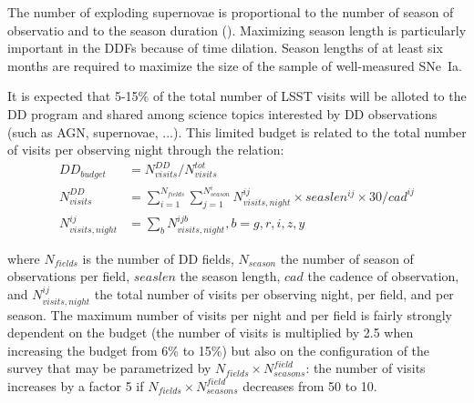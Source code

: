 \documentclass[skiphelvet,twocolumn]{aastex63}
\newcommand{\sne}{{SNe~Ia}}
\begin{document}
\par
The number of exploding supernovae is proportional to the number of season of observatio and to the season duration (\citealt{perrett}). Maximizing season length is particularly important in the DDFs because of time dilation. Season lengths of at least six months are required to maximize the size of the sample of well-measured \sne.
\par
It is expected that 5-15$\%$ of the total number of LSST visits will be alloted to the DD program and shared among science topics interested by DD observations (such as AGN, supernovae, ...).  This limited budget is related to the total number of visits per observing night through the relation:
\begin{equation}\label{eq:ddbudget}
\begin{aligned}
DD_{budget} &= N_{visits}^{DD}/N_{visits}^{tot} \\
  N_{visits}^{DD} &= \sum_{i=1}^{N_{fields}} \sum_{ j=1}^{N_{season}^i} N_{visits,night}^{ij}\times seaslen^{ij}\times 30/cad^{ij} \\
  N_{visits,night}^{ij} &=  \sum_{b} N_{visits,night}^{ijb}   , b=g,r,i,z,y
 \end{aligned}
 \end{equation}

where $N_{fields}$ is the number of DD fields, $N_{season}$ the number of season of observations per field, $seaslen$ the season length, $cad$ the cadence of observation, and $N_{visits, night}^{ij}$ the total number of visits per observing night, per field, and per season. The maximum number of visits per night and per field is fairly strongly dependent on the budget (the number of visits is multiplied by 2.5 when increasing the budget from 6\% to 15\%) but also on the configuration of the survey that may be parametrized by $N_{fields}\times N_{seasons}^{field}$: the number of visits increases by a factor 5 if $N_{fields}\times N_{seasons}^{field}$ decreases from 50 to 10.
\end{document}
